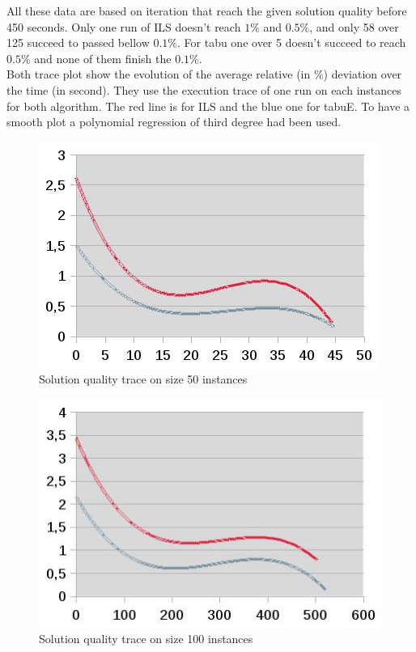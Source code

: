 \documentclass[12pt,a4paper]{article}
\begin{document}
All these data are based on iteration that reach the given solution quality before 450 seconds. Only one run of ILS doesn't reach $1 \%$ and $0.5 \%$, and only 58 over 125 succeed to passed bellow $0.1 \%$. For tabu one over 5 doesn't succeed to reach $0.5 \%$ and none of them finish the $0.1 \%$.\\

Both trace plot show the evolution of the average relative (in $\%$) deviation over the time (in second). They use the execution trace of one run on each instances for both algorithm. The red line is for ILS and the blue one for tabuE. To have a smooth plot a polynomial regression of third degree had been used.\\

\begin{figure}[!h]
\centering
\includegraphics[scale=0.7]{corelation_plot_50.jpg}
\caption{Solution quality trace on size 50 instances}
\label{Solution quality trace on size 50 instances}
\end{figure}

\begin{figure}[!h]
\centering
\includegraphics[scale=0.7]{corelation_plot_100.jpg}
\caption{Solution quality trace on size 100 instances}
\label{Solution quality trace on size 100 instances}
\end{figure}
\end{document}
